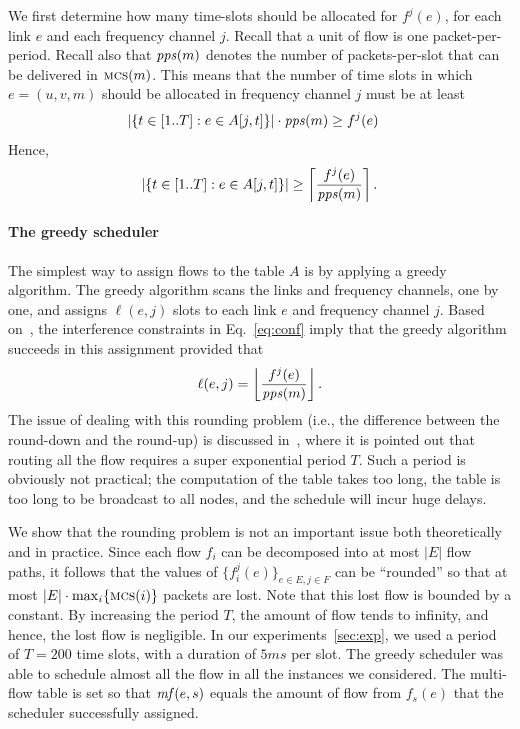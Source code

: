 \documentclass[12pt]{article}
\newenvironment{proof sketch}[1]{\noindent {\emph{Proof sketch of #1:}}}{\hfill \qed}
\newcommand{\pps}{\text{\emph{pps}}}
\newcommand{\mf}{\text{\emph{mf}}}
\newcommand{\MCS}{\text{\sc{mcs}}}
\begin{document}
We first determine how many time-slots should be allocated for
$f^j(e)$, for each link $e$ and each frequency channel $j$.  Recall
that a unit of flow is one packet-per-period.  Recall also that $\pps(m)$
denotes the number of packets-per-slot that can be delivered in
$\MCS(m)$.  This means that the number of time slots in which
$e=(u,v,m)$ should be allocated in frequency channel $j$ must be at
least
\begin{align*}
  |\{ t\in[1..T] :e\in A[j,t]\}| \cdot \pps(m) &\geq f^j(e)
\end{align*}
Hence,
\begin{align}\label{eq:req}
  |\{ t\in[1..T] :e\in A[j,t]\}| \geq \left\lceil \frac{f^j(e)}{\pps(m)} \right\rceil.
  \end{align}
\paragraph{The greedy scheduler}
  The simplest way to assign flows to the table $A$ is by applying a
  greedy algorithm.  The greedy algorithm scans the links and
  frequency channels, one by one, and assigns $\ell(e,j)$ slots to
  each link $e$ and frequency channel $j$.  Based
  on~\cite{alicherry2005joint11,kumar2004end,buragohain2007improved},
  the interference constraints in Eq.~\ref{eq:conf} imply that the
  greedy algorithm succeeds in this assignment provided that
\begin{align}\label{eq:guar}
 \ell(e,j) = \left\lfloor \frac{f^j(e)}{\pps(m)} \right\rfloor.
  \end{align}
  The issue of dealing with this rounding problem (i.e., the
  difference between the round-down and the round-up) is discussed
  in~\cite{wan2009multiflows}, where it is pointed out that routing
  all the flow requires a super exponential period $T$. Such a period
  is obviously not practical; the computation of the table takes too
  long, the table is too long to be broadcast to all nodes, and
  the schedule will incur huge delays.

  We show that the rounding problem is not an important issue both
  theoretically and in practice.  Since each flow $f_i$ can be
  decomposed into at most $|E|$ flow paths, it follows that the values
  of $\{f^j_i(e)\}_{e\in E, j\in F}$ can be ``rounded'' so that at
  most $|E|\cdot \max_i \{\MCS(i)\}$ packets are lost.  Note that this
  lost flow is bounded by a constant. By increasing the period $T$,
  the amount of flow tends to infinity, and hence, the lost flow is
  negligible. In our experiments~\ref{sec:exp}, we used a period of
  $T=200$ time slots, with a duration of $5ms$ per slot. The greedy
  scheduler was able to schedule almost all the flow in all the
  instances we considered.  The multi-flow table is set so that
  $\mf(e,s)$ equals the amount of flow from $f_s(e)$ that the
  scheduler successfully assigned.
\end{document}
